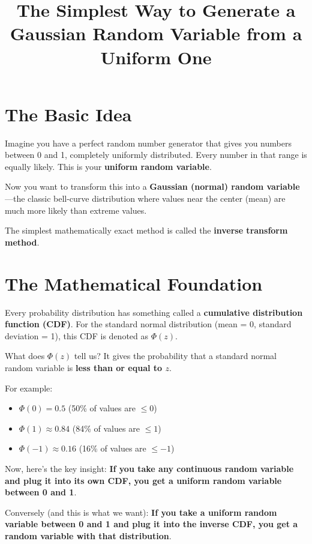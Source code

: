 \documentclass[12pt]{article}
\title{The Simplest Way to Generate a Gaussian Random Variable from a Uniform One}
\author{}
\date{}
\begin{document}
\maketitle
\Large

\section*{The Basic Idea}

Imagine you have a perfect random number generator that gives you numbers between 0 and 1, completely uniformly distributed. Every number in that range is equally likely. This is your \textbf{uniform random variable}.

Now you want to transform this into a \textbf{Gaussian (normal) random variable}---the classic bell-curve distribution where values near the center (mean) are much more likely than extreme values.

The simplest mathematically exact method is called the \textbf{inverse transform method}.

\section*{The Mathematical Foundation}

Every probability distribution has something called a \textbf{cumulative distribution function (CDF)}. For the standard normal distribution (mean = 0, standard deviation = 1), this CDF is denoted as \textbf{$\Phi(z)$}.

What does $\Phi(z)$ tell us? It gives the probability that a standard normal random variable is \textbf{less than or equal to $z$}.

For example:
\begin{itemize}
\item $\Phi(0) = 0.5$ (50\% of values are $\leq 0$)
    \item $\Phi(1) \approx 0.84$ (84\% of values are $\leq 1$)
    \item $\Phi(-1) \approx 0.16$ (16\% of values are $\leq -1$)
\end{itemize}
Now, here's the key insight: \textbf{If you take any continuous random variable and plug it into its own CDF, you get a uniform random variable between 0 and 1}.

Conversely (and this is what we want): \textbf{If you take a uniform random variable between 0 and 1 and plug it into the inverse CDF, you get a random variable with that distribution}.
\end{document}
